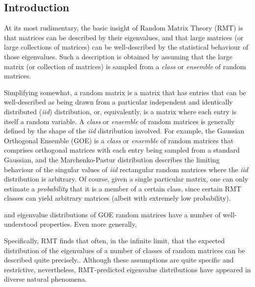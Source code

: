 \documentclass[12pt]{spieman}  %
\begin{document}
\begin{spacing}{2}

\section{Introduction}
\label{sect:intro}

\color{cyan}

At its most rudimentary, the basic insight of Random Matrix Theory (RMT) is
that matrices can be described by their eigenvalues, and that
large matrices (or large collections of matrices) can be
well-described by the statistical behaviour of those eigenvalues. Such a
description is obtained by assuming that the large matrix (or collection
of matrices) is sampled from a \textit{class} or \textit{ensemble} of random
matrices.

Simplifying somewhat, a random matrix is a matrix that has entries that can be
well-described as being drawn from a particular independent and identically
distributed (\textit{iid}) distribution, or, equivalently, is a matrix where
each entry is itself a random variable. A \textit{class} or \textit{ensemble}
of random matrices is generally defined by the shape of the \textit{iid}
distribution involved. For example, the Gaussian Orthogonal Ensemble (GOE) is a
\textit{class} or \textit{ensemble} of random matrices that comprises
orthogonal matrices with each entry being sampled from a standard Gaussian, and
the Marchenko-Pastur distribution describes the limiting behaviour of the
singular values of \textit{iid} rectangular random matrices where the
\textit{iid} distribution is arbitrary\cite{mehtaRandomMatrices2004}. Of
course, given a single particular matrix, one can only estimate a
\textit{probability} that it is a member of a certain class, since certain RMT
classes can yield arbitrary matrices (albeit with extremely low probability).


and eigenvalue distributions of GOE random matrices have a
number of well-understood properties\cite{mehtaRandomMatrices2004,
guhrRandommatrixTheoriesQuantum1998a}. Even more generally,



Specifically, RMT finds that often, in the infinite limit, that the expected
distribution of the eigenvalues of a number of classes of random matrices can
be described quite precisely.\cite{andersonIntroductionRandomMatrices2010,
akemannOxfordHandbookRandom2011, mehtaRandomMatrices2004}. Although these
assumptions are quite specific and restrictive, nevertheless, RMT-predicted
eigenvalue distributions have appeared in diverse natural phenomena.


\end{spacing}
\end{document}
